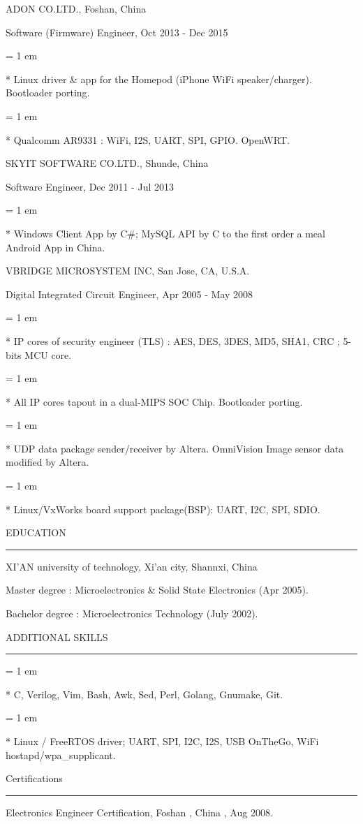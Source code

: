{ \medbreak } { \FFbg
ADON CO.LTD., Foshan, China
}

{ \FFte
Software (Firmware) Engineer, Oct 2013 - Dec 2015
}
{ \parindent = 1 em \item{*}
 Linux driver \& app for the Homepod (iPhone WiFi speaker/charger). Bootloader porting.
}
{ \parindent = 1 em \item{*}
 Qualcomm AR9331 : WiFi, I2S, UART, SPI, GPIO. OpenWRT.
 }

{ \medbreak } { \FFbg
SKYIT SOFTWARE CO.LTD., Shunde, China
}

{ \FFte
Software Engineer, Dec 2011 - Jul 2013
}
{ \parindent = 1 em \item{*}
 Windows Client App by C\#; MySQL API by C to the first order a meal Android App in China.
 }

{ \medbreak } { \FFbg
VBRIDGE MICROSYSTEM INC, San Jose, CA, U.S.A.
}

{ \FFte
Digital Integrated Circuit Engineer, Apr 2005 - May 2008
}
{ \parindent = 1 em \item{*}
 IP cores of security engineer (TLS) :
 AES, DES, 3DES, MD5, SHA1, CRC ;
 5-bits MCU core.
 }
{ \parindent = 1 em \item{*}
All IP cores tapout in a dual-MIPS SOC Chip. Bootloader porting. 
 }
{ \parindent = 1 em \item{*}
UDP data package sender/receiver by Altera. OmniVision Image sensor data modified by Altera.
 }
{ \parindent = 1 em \item{*}
Linux/VxWorks board support package(BSP): UART, I2C, SPI, SDIO.
 }

{ \medbreak } { \FFbg
EDUCATION
}
{ \smallbreak } {\par\noindent\hrule} { \smallbreak }
XI'AN university of technology, Xi'an city, Shannxi, China

{ \FFte
Master degree : Microelectronics \& Solid State Electronics (Apr 2005).
}

{ \FFte
Bachelor degree : Microelectronics Technology (July 2002).
}

{ \medbreak } { \FFbg
ADDITIONAL SKILLS
}
{ \smallbreak } {\par\noindent\hrule} { \smallbreak }
{ \parindent = 1 em \item{*}
 C, Verilog, Vim, Bash, Awk, Sed, Perl, Golang, Gnumake, Git.
 }
{ \parindent = 1 em \item{*}
 Linux / FreeRTOS driver; UART, SPI, I2C, I2S, USB OnTheGo, WiFi hostapd/wpa\_supplicant.
 }

{ \medbreak } { \FFbg
Certifications
}
{ \smallbreak } {\par\noindent\hrule} { \smallbreak }
Electronics Engineer Certification, Foshan , China , Aug 2008.

